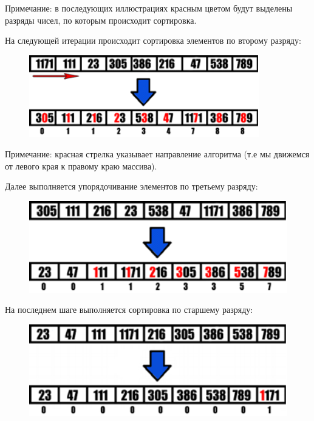 \documentclass{report}
\begin{document}
Примечание: в последующих иллюстрациях красным цветом будут выделены разряды чисел, по которым происходит сортировка.


На следующей итерации происходит сортировка элементов по второму разряду:

\begin{figure}[htp]
    \centering
    \includegraphics[width=10cm]{images/image3.png}
    \label{fig:galaxy}
\end{figure}
\newpage
Примечание: красная стрелка указывает направление алгоритма (т.е мы движемся от левого края к правому краю массива).

Далее выполняется упорядочивание элементов по третьему разряду:

\begin{figure}[htp]
    \centering
    \includegraphics[width=14cm]{images/image4.png}
    \label{fig:galaxy}
\end{figure}

На последнем шаге выполняется сортировка по старшему разряду:

\begin{figure}[htp]
    \centering
    \includegraphics[width=14cm]{images/image5.png}
    \label{fig:galaxy}
\end{figure}
\end{document}

